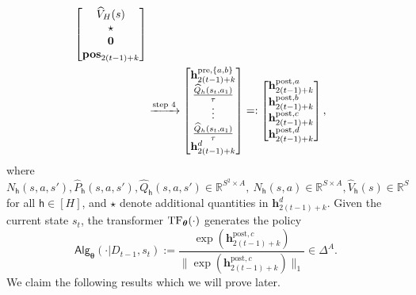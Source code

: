 \documentclass[10pt]{article}
\newcommand{\<}{\left\langle}
\renewcommand{\>}{\right\rangle}
\newcommand{\TF}{{\rm TF}}
\newcommand{\bzero}{{\mathbf 0}}
\newcommand{\R}{\mathbb{R}}
\newcommand{\pre}{{\mathrm{pre}}}
\newcommand{\posv}{{\mathbf{pos}}}
\newcommand{\post}{{\mathrm{post}}}
\newcommand{\parta}{{a}}
\newcommand{\partb}{{b}}
\newcommand{\partc}{{c}}
\newcommand{\partd}{{d}}
\newcommand{\temp}{{\tau}}
\newcommand{\state}{{s}}
\newcommand{\action}{{a}}
\newcommand{\sAlg}{{\mathsf{Alg}}}
\newcommand{\dset}{{D}}
\newcommand{\horizon}{{H}}
\renewcommand{\horizon}{{H}}
\newcommand{\esttransit}{\widehat{P}}
\newcommand{\valuefun}{{V}}
\newcommand{\tfpar}{{\btheta}}
\newcommand{\Numst}{{S}}
\newcommand{\Numact}{{A}}
\newcommand{\Numvi}{{N}}
\newcommand{\Qfun}{{Q}}
\newcommand{\estQfun}{{\widehat{\Qfun}}}
\newcommand{\Vfun}{{\valuefun}}
\newcommand{\estVfun}{{\widehat{\Vfun}}}
\def\btheta{{\boldsymbol \theta}}
\def\bh{{\mathbf h}}
\def\sh{{\mathsf{h}}}
\begin{document}
\begin{align}
\begin{bmatrix}
         \estVfun_{\horizon}(\state)  \\ \star
        \\ \bzero \\\posv_{2(t-1)+k}
\end{bmatrix}\notag\\
&
\xrightarrow{\text{step 4}}
\begin{bmatrix}
    \bh_{2(t-1)+k}^{\pre,\{\parta,\partb\}}\\ \frac{\estQfun_h(\state_t,\action_1)}{\temp}\\\vdots\\
\frac{\estQfun_h(\state_t,\action_1)}{\temp}
    \\ \bh_{2(t-1)+k}^{\partd}
\end{bmatrix}
=:
\begin{bmatrix}
    \bh_{2(t-1)+k}^{\post,\parta} \\  \bh_{2(t-1)+k}^{\post,\partb}\\  \bh_{2(t-1)+k}^{\post,\partc}\\   \bh_{2(t-1)+k}^{\post,\partd}
\end{bmatrix},\label{eq:ucbvi_roadmap}
\end{align}
where $\Numvi_{\sh}(\state,\action,\state'),\esttransit_{\sh}(\state,\action,\state'),\estQfun_{\sh}(\state,\action,\state')\in\R^{\Numst^2\times\Numact},~\Numvi_{\sh}(\state,\action)\in\R^{\Numst\times\Numact},\estVfun_{\sh}(\state)\in\R^\Numst$ for all $\sh\in[\horizon]$, and $\star$ denote additional quantities in $\bh^\partd_{2(t-1)+k}$. Given the current state $\state_t$, the transformer $\TF_\tfpar(\cdot)$ generates the policy $$\sAlg_\tfpar(\cdot|\dset_{t-1},\state_t):=\frac{\exp(\bh^{\post,\partc}_{2(t-1)+k})}{\|\exp(\bh^{\post,\partc}_{2(t-1)+k})\|_1}\in\Delta^\Numact.$$
We claim the following results which we will prove later.
\end{document}
